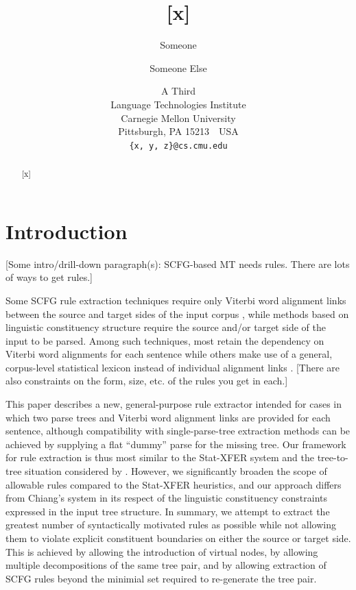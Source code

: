 \documentclass[11pt]{article}
\title{[x]}
\author{Someone \and Someone Else \and A Third \\
  Language Technologies Institute \\
  Carnegie Mellon University \\
  Pittsburgh, PA 15213\ \ USA \\
  {\tt \{x, y, z\}@cs.cmu.edu}}
\date{}
\begin{document}
\maketitle

\begin{abstract}
[x]
\end{abstract}


\section{Introduction}

[Some intro/drill-down paragraph(s): SCFG-based MT needs rules.  There are lots of ways to get rules.]

Some SCFG rule extraction techniques require only Viterbi word alignment links between the source and target sides of the input corpus \cite{Chiang-Hiero}, while methods based on linguistic constituency structure require the source and/or target side of the input to be parsed.  Among such techniques, most retain the dependency on Viterbi word alignments for each sentence \cite{GalleyEtAl-TransRule,ZollmannVenugopal-SyntaxAugmentedMT,Lavie-SSST,Chiang-SourceAndTarget} while others make use of a general, corpus-level statistical lexicon instead of individual alignment links \cite{ZhechevWay-DCUNodeAlignment}.  [There are also constraints on the form, size, etc. of the rules you get in each.]

This paper describes a new, general-purpose rule extractor intended for cases in which two parse trees and Viterbi word alignment links are provided for each sentence, although compatibility with single-parse-tree extraction methods can be achieved by supplying a flat ``dummy'' parse for the missing tree.  Our framework for rule extraction is thus most similar to the Stat-XFER system \cite{Lavie-SSST,AmbatiEtAl-ts2ts} and the tree-to-tree situation considered by .  However, we significantly broaden the scope of allowable rules compared to the Stat-XFER heuristics, and our approach differs from Chiang's system in its respect of the linguistic constituency constraints expressed in the input tree structure.  In summary, we attempt to extract the greatest number of syntactically motivated rules as possible while not allowing them to violate explicit constituent boundaries on either the source or target side.  This is achieved by allowing the introduction of virtual nodes, by allowing multiple decompositions of the same tree pair, and by allowing extraction of SCFG rules beyond the minimial set required to re-generate the tree pair.
\end{document}
